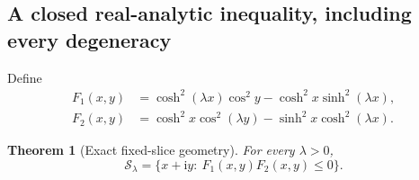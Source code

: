\documentclass[11pt]{article}
\numberwithin{equation}{section}
\newtheorem{theorem}{Theorem}[section]
\theoremstyle{definition}
\newcommand{\ii}{\mathrm i}
\newcommand{\cS}{\mathcal S}
\begin{document}
\subsection{A closed real-analytic inequality, including every degeneracy}

Define
\begin{align}
 F_1(x,y)&=\cosh^2(\lambda x)\cos^2y
                -\cosh^2x\sinh^2(\lambda x),\label{eq:F1}\\
 F_2(x,y)&=\cosh^2x\cos^2(\lambda y)
                -\sinh^2x\cosh^2(\lambda x).\label{eq:F2}
\end{align}

\begin{theorem}[Exact fixed-slice geometry]\label{thm:F1F2}
For every \(\lambda>0\),
\begin{equation}\label{eq:F1F2set}
 \boxed{\cS_\lambda=\{x+\ii y:\ F_1(x,y)F_2(x,y)\le0\}.}
\end{equation}
\end{theorem}
\end{document}
